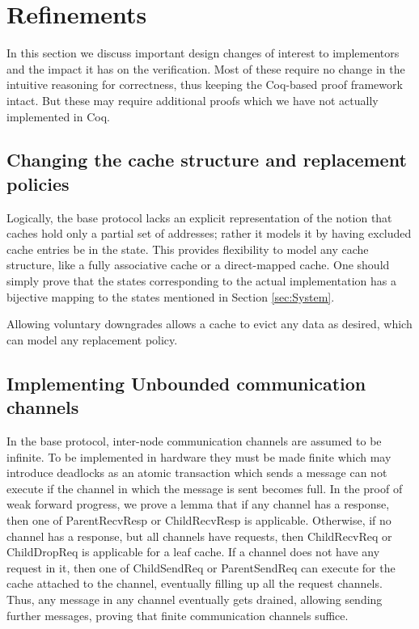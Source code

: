 \section{Refinements}
\label{Sec:Refinements}

In this section we discuss important design changes of interest to implementors
and the impact it has on the verification. Most of these require no change in
the intuitive reasoning for correctness, thus keeping the Coq-based proof
framework intact. But these may require additional proofs which we have not
actually implemented in Coq.


\subsection{Changing the cache structure and replacement policies}

Logically, the base protocol lacks an explicit representation of the notion
that caches hold only a partial set of addresses; rather it models it by having
excluded cache entries be in the \In{} state. This provides
flexibility to model any cache structure, like a fully associative cache or a
direct-mapped cache. One should simply prove that the states corresponding to
the actual implementation has a bijective mapping to the states mentioned in
Section \ref{sec:System}.

Allowing voluntary downgrades allows a cache to evict any data as desired,
which can model any replacement policy.

\subsection{Implementing Unbounded communication channels}

In the base protocol, inter-node communication channels are assumed to be
infinite. To be implemented in hardware they must be made finite which may
introduce deadlocks as an atomic transaction which sends a message can not
execute if the channel in which the message is sent becomes full. In the proof
of weak forward progress, we prove a lemma that if any channel has a response,
then one of ParentRecvResp or ChildRecvResp is applicable. Otherwise, if no
channel has a response, but all channels have requests, then ChildRecvReq or
ChildDropReq is applicable for a leaf cache. If a channel does not have any
request in it, then one of ChildSendReq or ParentSendReq can execute for the
cache attached to the channel, eventually filling up all the request channels.
Thus, any message in any channel eventually gets drained, allowing sending
further messages, proving that finite communication channels suffice.


